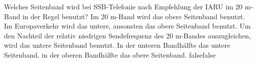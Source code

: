     {Welches Seitenband wird bei SSB-Telefonie nach Empfehlung der IARU im 20 m-Band in der Regel benutzt?}
    {Im 20 m-Band wird das obere Seitenband benutzt.}
    {Im Europaverkehr wird das untere, ansonsten das obere Seitenband benutzt.}
    {Um den Nachteil der relativ niedrigen Sendefrequenz des 20 m-Bandes auszugleichen, wird das untere Seitenband benutzt.}
    {In der unteren Bandhälfte das untere Seitenband, in der oberen Bandhälfte das obere Seitenband.}
    {false}{false}